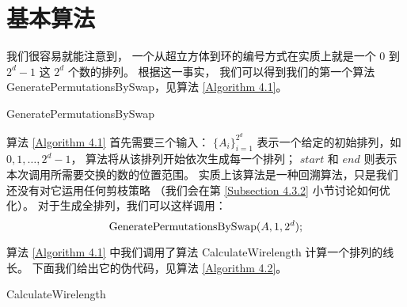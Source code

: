 \section{基本算法}
\label{Section 4.2}

我们很容易就能注意到，
一个从超立方体到环的编号方式在实质上就是一个 $0$ 到 $2^d - 1$ 这 $2^d$ 个数的排列。
根据这一事实，
我们可以得到我们的第一个算法 GeneratePermutationsBySwap，见算法 \ref{Algorithm 4.1}。

\begin{algorithm}
\caption{GeneratePermutationsBySwap}
\label{Algorithm 4.1}
\begin{algorithmic}[1]
	 
	 

		 
			 
		\EndIf
	\Else
			 
		\EndFor
	\EndIf
\end{algorithmic}
\end{algorithm}

算法 \ref{Algorithm 4.1} 首先需要三个输入：
$\{A_i\}_{i = 1}^{2^d}$ 表示一个给定的初始排列，如 $0, 1, \dots, 2^d - 1$，
算法将从该排列开始依次生成每一个排列；
$start$ 和 $end$ 则表示本次调用所需要交换的数的位置范围。
实质上该算法是一种回溯算法，只是我们还没有对它运用任何剪枝策略
（我们会在第 \ref{Subsection 4.3.2} 小节讨论如何优化）。
对于生成全排列，我们可以这样调用：
\begin{equation*}
\textnormal{GeneratePermutationsBySwap}(A, 1, 2^d);
\end{equation*}

算法 \ref{Algorithm 4.1} 中我们调用了算法 CalculateWirelength 计算一个排列的线长。
下面我们给出它的伪代码，见算法 \ref{Algorithm 4.2}。

\begin{algorithm}
\caption{CalculateWirelength}
\label{Algorithm 4.2}
\begin{algorithmic}[1]
	 
	 

			 
				\Else
				\EndIf
			\EndIf
		\EndFor
	\EndFor
\end{algorithmic}
\end{algorithm}

